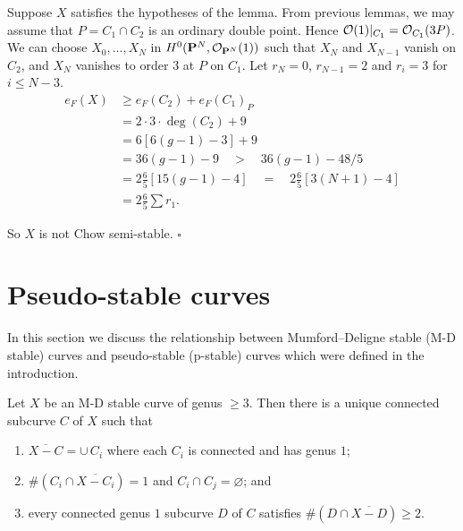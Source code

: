 \documentclass[12pt]{memoir}
\begin{document}
\begin{ptcbp}
Suppose $X$ satisfies the hypotheses of the lemma. From previous lemmas, we may assume that $P = C_1 \cap C_2$ is an ordinary double point. Hence $\mathcal{O}(1)|_{C_1} = \mathcal{O}_{C_1}(3P)$. We can choose $X_0, \dots, X_N$ in $H^0(\mathbf{P}^N, \mathcal{O}_{\mathbf{P}^N}(1))$ such that $X_N$ and $X_{N-1}$ vanish on $C_2$, and $X_N$ vanishes to order 3 at $P$ on $C_1$. Let $r_N = 0$, $r_{N-1} = 2$ and $r_i = 3$ for $i \leqslant N - 3$.
\begin{align*}
e_F(X) &\geqslant e_F(C_2) + e_F(C_1)_P \\
&= 2 \cdot 3 \cdot \deg(C_2) + 9 \\
&= 6[6(g-1) - 3] + 9 \\
&= 36(g-1) - 9 \quad > \quad 36(g-1) - 48/5 \\
&= 2\tfrac{6}{5}[15(g-1) - 4] \quad = \quad 2\tfrac{6}{5}[3(N+1) - 4] \\
&= 2\tfrac{6}{5} \sum r_1.
\end{align*}


So $X$ is not Chow semi-stable. \hfill$\square$
\end{ptcbp}

\section{Pseudo-stable curves}

In this section we discuss the relationship between Mumford--Deligne stable (M-D stable) curves and pseudo-stable (p-stable) curves which were defined in the introduction.

\begin{Lem}\label{lem:4.1}
Let $X$ be an M-D stable curve of genus $\geqslant 3$. Then there is a unique connected subcurve $C$ of $X$ such that

\begin{enumerate}[\upshape(i)]
\item $\overline{X - C} = \cup\, C_i$ where each $C_i$ is connected and has genus $1$;
\item $\#(C_i \cap \overline{X - C_i}) = 1$ and $C_i \cap C_j = \varnothing$; and
\item every connected genus $1$ subcurve $D$ of $C$ satisfies $\#(D \cap \overline{X - D}) \geqslant 2$.
\end{enumerate}
\end{Lem}
\end{document}

